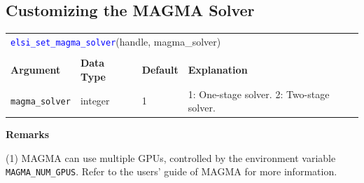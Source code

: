 \documentclass{report}
\newcommand{\api}[1]{\textcolor{blue}{\texttt{#1}}}
\begin{document}
\subsection{Customizing the MAGMA Solver}
\label{subsec:setter_magma}
\begin{tabular}[]{|p{30mm}|p{20mm}|p{15mm}|p{97mm}|}
\multicolumn{4}{l}{\api{elsi\_set\_magma\_solver}(handle, magma\_solver)}\\
\multicolumn{4}{l}{}\\
\hline
\multicolumn{1}{|l|}{\textbf{Argument}} & \multicolumn{1}{l|}{\textbf{Data Type}} & \multicolumn{1}{l|}{\textbf{Default}} & \multicolumn{1}{l|}{\textbf{Explanation}}\\
\hline
\texttt{magma\_solver} & integer & 1 & 1: One-stage solver. 2: Two-stage solver.\\
\hline
\end{tabular}

\textbf{Remarks}

(1) MAGMA can use multiple GPUs, controlled by the environment variable \texttt{MAGMA\_NUM\_GPUS}. Refer to the users' guide of MAGMA for more information.
\end{document}
